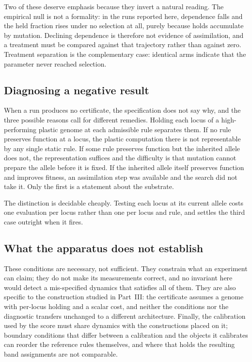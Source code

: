 \documentclass[man,12pt,floatsintext,donotrepeattitle]{apa7}
\begin{document}
Two of these deserve emphasis because they invert a natural reading. The empirical
null is not a formality: in the runs reported here, dependence falls and the held
fraction rises under no selection at all, purely because holds accumulate by
mutation. Declining dependence is therefore not evidence of assimilation, and a
treatment must be compared against that trajectory rather than against zero.
Treatment separation is the complementary case: identical arms indicate that the
parameter never reached selection.

\subsection{Diagnosing a negative result}

When a run produces no certificate, the specification does not say why, and the three
possible reasons call for different remedies. Holding each locus of a high-performing
plastic genome at each admissible rule separates them. If no rule preserves function
at a locus, the plastic computation there is not representable by any single static
rule. If some rule preserves function but the inherited allele does not, the
representation suffices and the difficulty is that mutation cannot prepare the allele
before it is fixed. If the inherited allele itself preserves function and improves
fitness, an assimilation step was available and the search did not take it. Only the
first is a statement about the substrate.

The distinction is decidable cheaply. Testing each locus at its current allele costs
one evaluation per locus rather than one per locus and rule, and settles the third
case outright when it fires.

\subsection{What the apparatus does not establish}

These conditions are necessary, not sufficient. They constrain what an experiment can
claim; they do not make its measurements correct, and no invariant here would detect a
mis-specified dynamics that satisfies all of them. They are also specific to the
construction studied in Part~III: the certificate assumes a genome with per-locus
holding and a scalar cost, and neither the conditions nor the diagnostic transfers
unchanged to a different architecture. Finally, the calibration used by the score must
share dynamics with the constructions placed on it; boundary conditions that differ
between a calibration and the objects it calibrates can reorder the reference rules
themselves, and where that holds the resulting band assignments are not comparable.
\end{document}
